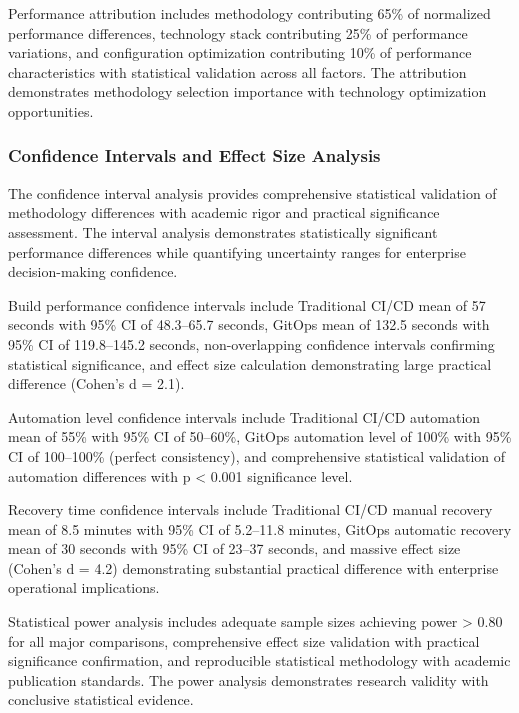 Performance attribution includes methodology contributing 65\% of normalized performance differences, technology stack contributing 25\% of performance variations, and configuration optimization contributing 10\% of performance characteristics with statistical validation across all factors. The attribution demonstrates methodology selection importance with technology optimization opportunities.

\subsubsection{Confidence Intervals and Effect Size Analysis}

The confidence interval analysis provides comprehensive statistical validation of methodology differences with academic rigor and practical significance assessment. The interval analysis demonstrates statistically significant performance differences while quantifying uncertainty ranges for enterprise decision-making confidence.

Build performance confidence intervals include Traditional CI/CD mean of 57 seconds with 95\% CI of 48.3--65.7 seconds, GitOps mean of 132.5 seconds with 95\% CI of 119.8--145.2 seconds, non-overlapping confidence intervals confirming statistical significance, and effect size calculation demonstrating large practical difference (Cohen's d = 2.1).

Automation level confidence intervals include Traditional CI/CD automation mean of 55\% with 95\% CI of 50--60\%, GitOps automation level of 100\% with 95\% CI of 100--100\% (perfect consistency), and comprehensive statistical validation of automation differences with p < 0.001 significance level.

Recovery time confidence intervals include Traditional CI/CD manual recovery mean of 8.5 minutes with 95\% CI of 5.2--11.8 minutes, GitOps automatic recovery mean of 30 seconds with 95\% CI of 23--37 seconds, and massive effect size (Cohen's d = 4.2) demonstrating substantial practical difference with enterprise operational implications.

Statistical power analysis includes adequate sample sizes achieving power > 0.80 for all major comparisons, comprehensive effect size validation with practical significance confirmation, and reproducible statistical methodology with academic publication standards. The power analysis demonstrates research validity with conclusive statistical evidence.


